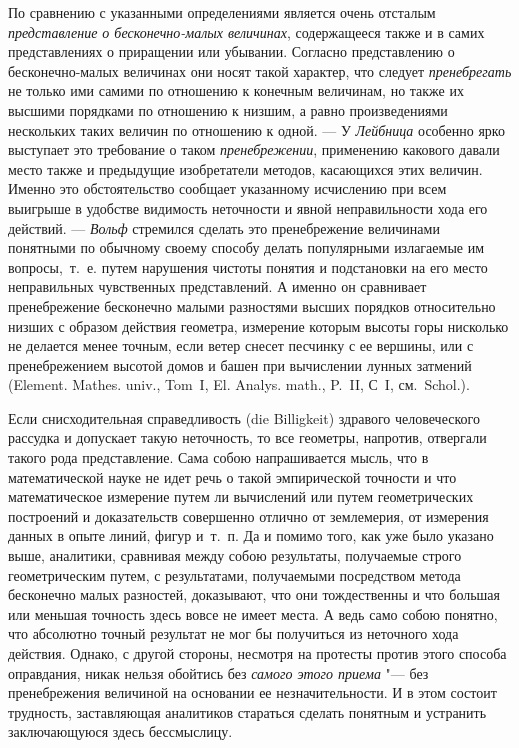 По сравнению с указанными определениями является очень отсталым
{\em представление о бесконечно-малых величинах},
содержащееся также и в самих представлениях о приращении или убывании.
Согласно представлению о бесконечно-малых величинах они носят такой
характер, что следует {\em пренебрегать} не только ими
самими по отношению к конечным величинам, но также их высшими порядками по
отношению к низшим, а равно произведениями нескольких таких величин по
отношению к одной. — У {\em Лейбница} особенно ярко
выступает это требование о таком {\em пренебрежении},
применению какового давали место также и предыдущие изобретатели методов,
касающихся этих величин. Именно это обстоятельство сообщает указанному
исчислению при всем выигрыше в удобстве видимость неточности и явной
неправильности хода его действий. — {\em Вольф}
стремился сделать это пренебрежение величинами понятными по обычному своему
способу делать популярными излагаемые им вопросы,~т.~е. путем нарушения
чистоты понятия и подстановки на его место неправильных чувственных
представлений. А именно он сравнивает пренебрежение бесконечно малыми
разностями высших порядков относительно низших с образом действия геометра,
измерение которым высоты горы нисколько не делается менее точным, если
ветер снесет песчинку с ее вершины, или с пренебрежением высотой домов и
башен при вычислении лунных затмений (Element. Mathes. univ.,
Tom~I, El. Analys. math., P.~II, С~I, см.~Schol.).

Если снисходительная справедливость (die Billigkeit) здравого человеческого
рассудка и допускает такую неточность, то все геометры, напротив, отвергали
такого рода представление. Сама собою напрашивается мысль, что в
математической науке не идет речь о такой эмпирической точности и что
математическое измерение путем ли вычислений или путем геометрических
построений и доказательств совершенно отлично от землемерия, от измерения
данных в опыте линий, фигур и~т.~п. Да и помимо того, как уже было указано
выше, аналитики, сравнивая между собою результаты, получаемые строго
геометрическим путем, с результатами, получаемыми посредством метода
бесконечно малых разностей, доказывают, что они тождественны и что большая
или меньшая точность здесь вовсе не имеет места. А ведь само собою понятно,
что абсолютно точный результат не мог бы получиться из неточного хода
действия. Однако, с другой стороны, несмотря на протесты против этого
способа оправдания, никак нельзя обойтись без
{\em самого этого приема} "--- без пренебрежения величиной
на основании ее незначительности. И в этом состоит трудность, заставляющая
аналитиков стараться сделать понятным и устранить заключающуюся здесь
бессмыслицу.

